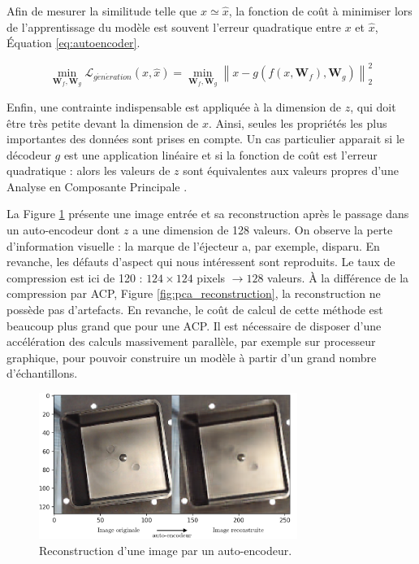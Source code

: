 Afin de mesurer la similitude telle que $x \simeq \hat x$, la fonction de coût à minimiser lors de l'apprentissage du modèle est souvent l'erreur quadratique entre $x$ et $\hat x$, Équation \ref{eq:autoencoder}.

\begin{equation} \label{eq:autoencoder}
\min _{\mathbf{W}_{f}, \mathbf{W}_{g}} \mathcal{L}_{g\acute{e}n\acute{e}ration}\left(x, \hat{x}\right) = \min _{\mathbf{W}_{f}, \mathbf{W}_{g}} \left\|x-g\left(f\left(x, \mathbf{W}_{f}\right), \mathbf{W}_{g}\right)\right\|_{2}^{2}
\end{equation}

Enfin, une contrainte indispensable est appliquée à la dimension de $z$, qui doit être très petite devant la dimension de $x$.
Ainsi, seules les propriétés les plus importantes des données sont prises en compte.
Un cas particulier apparait si le décodeur $g$ est une application linéaire et si la fonction de coût est l'erreur quadratique : alors les valeurs de $z$ sont équivalentes aux valeurs propres d'une Analyse en Composante Principale \cite{bourlard_autoassociation_1988}.

La Figure \ref{fig:autoencoder} présente une image entrée et sa reconstruction après le passage dans un auto-encodeur dont $z$ a une dimension de 128 valeurs.
On observe la perte d'information visuelle : la marque de l'éjecteur a, par exemple, disparu.
En revanche, les défauts d'aspect qui nous intéressent sont reproduits.
Le taux de compression est ici de 120 : $124 \times 124$ pixels $\rightarrow 128$ valeurs.
À la différence de la compression par ACP, Figure \ref{fig:pca_reconstruction}, la reconstruction ne possède pas d'artefacts.
En revanche, le coût de calcul de cette méthode est beaucoup plus grand que pour une ACP.
Il est nécessaire de disposer d'une accélération des calculs massivement parallèle, par exemple sur processeur graphique, pour pouvoir construire un modèle à partir d'un grand nombre d'échantillons.

\begin{figure}[hbtp]
    \centering
    \includegraphics[width=0.75\textwidth,height=\textheight,keepaspectratio]{../Chap3/Figures/visualize_reconstructed_variations.png}
    \caption{Reconstruction d'une image par un auto-encodeur.}
    \label{fig:autoencoder}
\end{figure}

